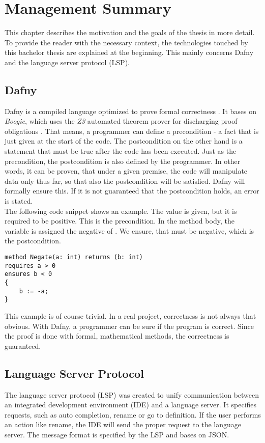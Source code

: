 \section{Management Summary}
\label{section:management_summary}
This chapter describes the motivation and the goals of the thesis in more detail.
To provide the reader with the necessary context, the technologies touched by this bachelor thesis are explained at the beginning.
This mainly concerns Dafny and the language server protocol (LSP).

\subsection{Dafny}
\label{section:management_summary:dafny}
Dafny is a compiled language optimized to prove formal correctness \cite{dafnyWiki}.
It bases on \textit{Boogie}, which uses the \textit{Z3} automated theorem prover for discharging proof obligations \cite{dafnyWiki}.
That means, a programmer can define a precondition - a fact that is just given at the start of the code.
The postcondition on the other hand is a statement that must be true after the code has been executed.
Just as the precondition, the postcondition is also defined by the programmer.
In other words, it can be proven, that under a given premise, the code will manipulate data only thus far, so that also the postcondition will be satisfied.
Dafny will formally ensure this.
If it is not guaranteed that the postcondition holds, an error is stated.\\

The following code snippet shows an example.
The value  is given, but it is required to be positive.
This is the precondition.
In the method body, the variable  is assigned the negative of .
We ensure, that  must be negative, which is the postcondition.
\begin{lstlisting}[language=dafny, caption={Simple Dafny Example}, captionpos=b, label={lst:simpleDafnyExample}]
method Negate(a: int) returns (b: int)
requires a > 0
ensures b < 0
{
    b := -a;
}
\end{lstlisting}
This example is of course trivial.
In a real project, correctness is not always that obvious.
With Dafny, a programmer can be sure if the program is correct.
Since the proof is done with formal, mathematical methods, the correctness is guaranteed.\\


\subsection{Language Server Protocol}
The language server protocol (LSP) was created to unify communication between an integrated development environment (IDE) and a language server.
It specifies requests, such as auto completion, rename or go to definition.
If the user performs an action like rename, the IDE will send the proper request to the language server.
The message format is specified by the LSP and bases on JSON.

